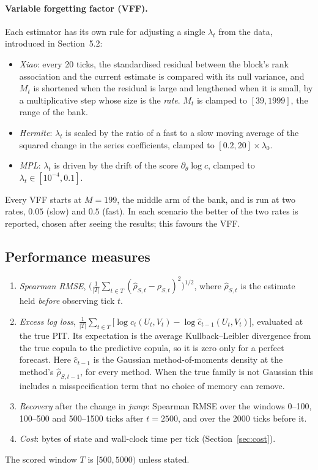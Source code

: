 \paragraph{Variable forgetting factor (VFF).} Each estimator has its own rule for adjusting a
single $\lambda_t$ from the data, introduced in Section~5.2:
\begin{itemize}
  \item \emph{Xiao}: every 20 ticks, the standardised residual between the block's rank
    association and the current estimate is compared with its null variance, and $M_t$ is
    shortened when the residual is large and lengthened when it is small, by a multiplicative
    step whose size is the \emph{rate}. $M_t$ is clamped to $[39,1999]$, the range of the bank.
  \item \emph{Hermite}: $\lambda_t$ is scaled by the ratio of a fast to a slow moving average of
    the squared change in the series coefficients, clamped to $[0.2,20]\times\lambda_0$.
  \item \emph{MPL}: $\lambda_t$ is driven by the drift of the score $\partial_\theta\log c$,
    clamped to $\lambda_t\in[10^{-4},0.1]$.
\end{itemize}
Every VFF starts at $M=199$, the middle arm of the bank, and is run at two rates, $0.05$ (slow) and
$0.5$ (fast). In each scenario the better of the two rates is reported, chosen after seeing the
results; this favours the VFF.

\subsection{Performance measures}
\label{sec:metrics}

\begin{enumerate}
  \item \emph{Spearman RMSE}, $\big(\frac1{|T|}\sum_{t\in T}(\hat\rho_{S,t}-\rho_{S,t})^2\big)^{1/2}$,
    where $\hat\rho_{S,t}$ is the estimate held \emph{before} observing tick $t$.
  \item \emph{Excess log loss}, $\frac1{|T|}\sum_{t\in T}\big[\log c_t(U_t,V_t)-\log
    \hat c_{t-1}(U_t,V_t)\big]$, evaluated at the true PIT. Its expectation is the average
    Kullback--Leibler divergence from the true copula to the predictive copula, so it is zero only
    for a perfect forecast. Here $\hat c_{t-1}$ is the Gaussian method-of-moments density at the
    method's $\hat\rho_{S,t-1}$, for every method. When the true family is not Gaussian this
    includes a misspecification term that no choice of memory can remove.
  \item \emph{Recovery} after the change in \emph{jump}: Spearman RMSE over the windows
    0--100, 100--500 and 500--1500 ticks after $t=2500$, and over the 2000 ticks before it.
  \item \emph{Cost}: bytes of state and wall-clock time per tick (Section~\ref{sec:cost}).
\end{enumerate}
The scored window $T$ is $[500,5000)$ unless stated.

